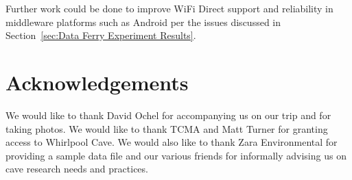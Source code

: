 \documentclass[10pt,twocolumn]{article}
\begin{document}
Further work could be done to improve WiFi Direct support and reliability in middleware platforms such as Android per the issues discussed in Section~\ref{sec:Data Ferry Experiment Results}.

\section{Acknowledgements}
\label{sec:Acknowledgements}
We would like to thank David Ochel for accompanying us on our trip and for taking photos. 
We would like to thank TCMA and Matt Turner for granting access to Whirlpool Cave. 
We would also like to thank Zara Environmental for providing a sample data file
and our various friends for informally advising us on cave research needs and practices.


\end{document}
